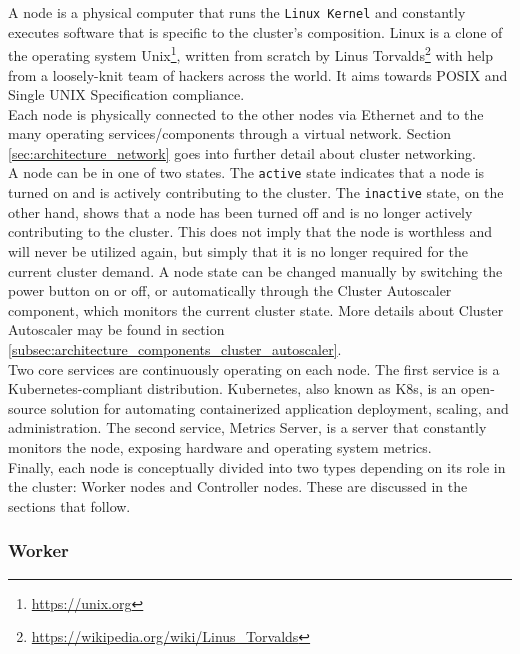 A node is a physical computer that runs the \texttt{Linux Kernel} and constantly
executes software that is specific to the cluster's composition. Linux is a
clone of the operating system Unix\footnote{\url{https://unix.org}}, written from
scratch by Linus Torvalds\footnote{\url{https://wikipedia.org/wiki/Linus_Torvalds}}
with help from a loosely-knit team of hackers across the world. It aims towards
POSIX and Single UNIX Specification compliance\cite{linux}.\\ %
Each node is physically connected to the other nodes via Ethernet and to the
many operating services/components through a virtual network. Section \ref{sec:architecture_network}
goes into further detail about cluster networking. \\ %
A node can be in one of two states. The \texttt{active} state indicates that a node
is turned on and is actively contributing to the cluster. The \texttt{inactive} state,
on the other hand, shows that a node has been turned off and is no longer actively
contributing to the cluster. This does not imply that the node is worthless and
will never be utilized again, but simply that it is no longer required for the current
cluster demand. A node state can be changed manually by switching the power
button on or off, or automatically through the Cluster Autoscaler component,
which monitors the current cluster state. More details about Cluster Autoscaler may
be found in section \ref{subsec:architecture_components_cluster_autoscaler}. \\ %
Two core services are continuously operating on each node. The first service is
a Kubernetes-compliant distribution. Kubernetes, also known as K8s, is an open-source
solution for automating containerized application deployment, scaling, and administration\cite{k8s}.
The second service, Metrics Server, is a server that constantly monitors the node,
exposing hardware and operating system metrics. \\ %
Finally, each node is conceptually divided into two types depending on its role in
the cluster: Worker nodes and Controller nodes. These are discussed in the sections
that follow.

\subsubsection{Worker}
\label{subsubsec:architecture_components_node_worker}


